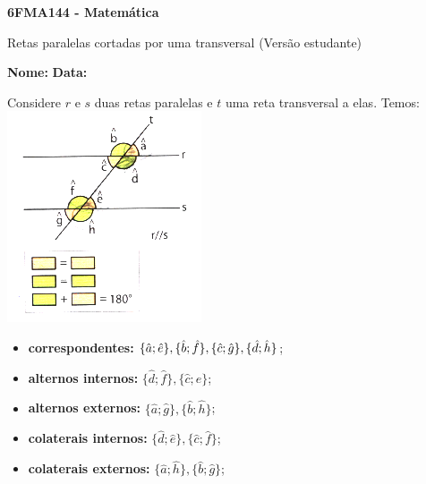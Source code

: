 \documentclass[a4paper,14pt]{article}
\begin{document}
	
	\noindent\textbf{6FMA144 - Matemática} 
	
	\begin{center}Retas paralelas cortadas por uma transversal (Versão estudante)
	\end{center}
	
	\noindent\textbf{Nome:} \underline{\hspace{10cm}}
	\noindent\textbf{Data:} \underline{\hspace{4cm}}
	
	
	\begin{multicols}{2}
	    \noindent Considere $r$ e $s$ duas retas paralelas e $t$ uma reta transversal a elas. Temos: \\
	    \includegraphics[width=1\linewidth]{6FMA144_imagens/imagem1} \\
	    \begin{itemize}
	    	\item \textbf{correspondentes:} $\{\hat{a}; \hat{e}\}, \{\hat{b}; \hat{f}\}, \\ \{\hat{c}; \hat{g}\}, \{\hat{d}; \hat{h}\}$;
	    	\item \textbf{alternos internos:} $\{\hat{d}; \hat{f}\}, \{\hat{c}; \hat{e}\}$;
	    	\item \textbf{alternos externos:} $\{\hat{a}; \hat{g}\}, \{\hat{b}; \hat{h}\}$;
	    	\item \textbf{colaterais internos:} $\{\hat{d}; \hat{e}\}, \{\hat{c}; \hat{f}\}$;
	    	\item \textbf{colaterais externos:} $\{\hat{a}; \hat{h}\}, \{\hat{b}; \hat{g}\}$;
	    \end{itemize}
	    

\end{multicols}
\end{document}
